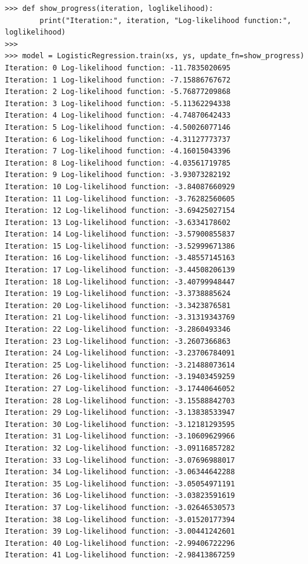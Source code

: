 \documentclass{report}
\begin{document}
\begin{verbatim}
>>> def show_progress(iteration, loglikelihood):
        print("Iteration:", iteration, "Log-likelihood function:", loglikelihood)
>>>
>>> model = LogisticRegression.train(xs, ys, update_fn=show_progress)
Iteration: 0 Log-likelihood function: -11.7835020695
Iteration: 1 Log-likelihood function: -7.15886767672
Iteration: 2 Log-likelihood function: -5.76877209868
Iteration: 3 Log-likelihood function: -5.11362294338
Iteration: 4 Log-likelihood function: -4.74870642433
Iteration: 5 Log-likelihood function: -4.50026077146
Iteration: 6 Log-likelihood function: -4.31127773737
Iteration: 7 Log-likelihood function: -4.16015043396
Iteration: 8 Log-likelihood function: -4.03561719785
Iteration: 9 Log-likelihood function: -3.93073282192
Iteration: 10 Log-likelihood function: -3.84087660929
Iteration: 11 Log-likelihood function: -3.76282560605
Iteration: 12 Log-likelihood function: -3.69425027154
Iteration: 13 Log-likelihood function: -3.6334178602
Iteration: 14 Log-likelihood function: -3.57900855837
Iteration: 15 Log-likelihood function: -3.52999671386
Iteration: 16 Log-likelihood function: -3.48557145163
Iteration: 17 Log-likelihood function: -3.44508206139
Iteration: 18 Log-likelihood function: -3.40799948447
Iteration: 19 Log-likelihood function: -3.3738885624
Iteration: 20 Log-likelihood function: -3.3423876581
Iteration: 21 Log-likelihood function: -3.31319343769
Iteration: 22 Log-likelihood function: -3.2860493346
Iteration: 23 Log-likelihood function: -3.2607366863
Iteration: 24 Log-likelihood function: -3.23706784091
Iteration: 25 Log-likelihood function: -3.21488073614
Iteration: 26 Log-likelihood function: -3.19403459259
Iteration: 27 Log-likelihood function: -3.17440646052
Iteration: 28 Log-likelihood function: -3.15588842703
Iteration: 29 Log-likelihood function: -3.13838533947
Iteration: 30 Log-likelihood function: -3.12181293595
Iteration: 31 Log-likelihood function: -3.10609629966
Iteration: 32 Log-likelihood function: -3.09116857282
Iteration: 33 Log-likelihood function: -3.07696988017
Iteration: 34 Log-likelihood function: -3.06344642288
Iteration: 35 Log-likelihood function: -3.05054971191
Iteration: 36 Log-likelihood function: -3.03823591619
Iteration: 37 Log-likelihood function: -3.02646530573
Iteration: 38 Log-likelihood function: -3.01520177394
Iteration: 39 Log-likelihood function: -3.00441242601
Iteration: 40 Log-likelihood function: -2.99406722296
Iteration: 41 Log-likelihood function: -2.98413867259
\end{verbatim}
\end{document}
